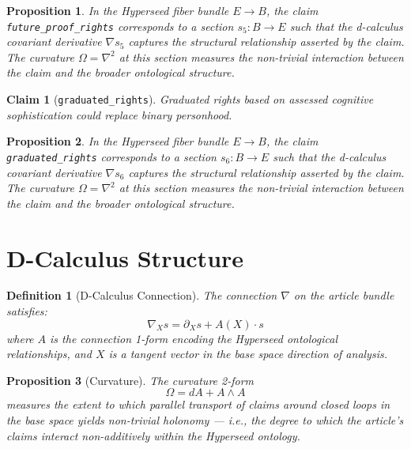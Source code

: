 \documentclass{article}
\newtheorem{claim}{Claim}
\newtheorem{definition}{Definition}
\newtheorem{proposition}{Proposition}
\begin{document}
\begin{proposition}
In the Hyperseed fiber bundle $E \to B$, the claim \texttt{future_proof_rights} corresponds to a section $s_5: B \to E$ such that the d-calculus covariant derivative $\nabla s_5$ captures the structural relationship asserted by the claim. The curvature $\Omega = \nabla^2$ at this section measures the non-trivial interaction between the claim and the broader ontological structure.
\end{proposition}

\begin{claim}[\texttt{graduated_rights}]
Graduated rights based on assessed cognitive sophistication could replace binary personhood.
\end{claim}

\begin{proposition}
In the Hyperseed fiber bundle $E \to B$, the claim \texttt{graduated_rights} corresponds to a section $s_6: B \to E$ such that the d-calculus covariant derivative $\nabla s_6$ captures the structural relationship asserted by the claim. The curvature $\Omega = \nabla^2$ at this section measures the non-trivial interaction between the claim and the broader ontological structure.
\end{proposition}

\section{D-Calculus Structure}

\begin{definition}[D-Calculus Connection]
The connection $\nabla$ on the article bundle satisfies:
\begin{equation}
  \nabla_X s = \partial_X s + A(X) \cdot s
\end{equation}
where $A$ is the connection 1-form encoding the Hyperseed ontological relationships, and $X$ is a tangent vector in the base space direction of analysis.
\end{definition}

\begin{proposition}[Curvature]
The curvature 2-form
\begin{equation}
  \Omega = dA + A \wedge A
\end{equation}
measures the extent to which parallel transport of claims around closed loops in the base space yields non-trivial holonomy --- i.e., the degree to which the article's claims interact non-additively within the Hyperseed ontology.
\end{proposition}
\end{document}
